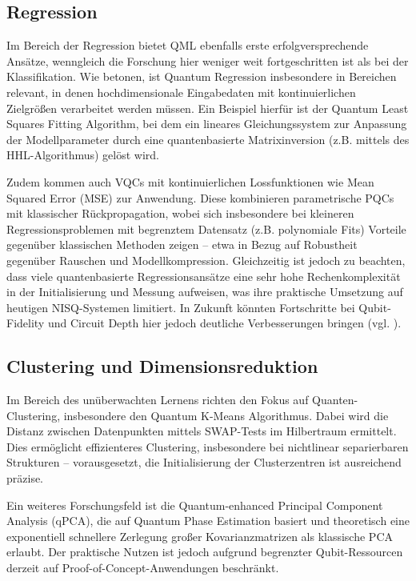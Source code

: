 \subsection{Regression}
Im Bereich der Regression bietet QML ebenfalls erste erfolgversprechende Ansätze, wenngleich die Forschung hier weniger weit fortgeschritten ist als bei der Klassifikation. Wie \cite{chengNoisyIntermediatescaleQuantum2023} betonen, ist Quantum Regression insbesondere in Bereichen relevant, in denen hochdimensionale Eingabedaten mit kontinuierlichen Zielgrößen verarbeitet werden müssen. Ein Beispiel hierfür ist der Quantum Least Squares Fitting Algorithm, bei dem ein lineares Gleichungssystem zur Anpassung der Modellparameter durch eine quantenbasierte Matrixinversion (z.B. mittels des HHL-Algorithmus) gelöst wird.

Zudem kommen auch VQCs mit kontinuierlichen Lossfunktionen wie Mean Squared Error (MSE) zur Anwendung. Diese kombinieren parametrische PQCs mit klassischer Rückpropagation, wobei sich insbesondere bei kleineren Regressionsproblemen mit begrenztem Datensatz (z.B. polynomiale Fits) Vorteile gegenüber klassischen Methoden zeigen – etwa in Bezug auf Robustheit gegenüber Rauschen und Modellkompression.
Gleichzeitig ist jedoch zu beachten, dass viele quantenbasierte Regressionsansätze eine sehr hohe Rechenkomplexität in der Initialisierung und Messung aufweisen, was ihre praktische Umsetzung auf heutigen NISQ-Systemen limitiert. In Zukunft könnten Fortschritte bei Qubit-Fidelity und Circuit Depth hier jedoch deutliche Verbesserungen bringen (vgl. \cite{schuld_et_al_quantum_2019}).


\subsection{Clustering und Dimensionsreduktion}
Im Bereich des unüberwachten Lernens richten \cite{gujjuQuantumMachineLearning2024} den Fokus auf Quanten-Clustering, insbesondere den Quantum K-Means Algorithmus. Dabei wird die Distanz zwischen Datenpunkten mittels SWAP-Tests im Hilbertraum ermittelt. Dies ermöglicht effizienteres Clustering, insbesondere bei nichtlinear separierbaren Strukturen – vorausgesetzt, die Initialisierung der Clusterzentren ist ausreichend präzise.

Ein weiteres Forschungsfeld ist die Quantum-enhanced Principal Component Analysis (qPCA), die auf Quantum Phase Estimation basiert und theoretisch eine exponentiell schnellere Zerlegung großer Kovarianzmatrizen als klassische PCA erlaubt. Der praktische Nutzen ist jedoch aufgrund begrenzter Qubit-Ressourcen derzeit auf Proof-of-Concept-Anwendungen beschränkt.

